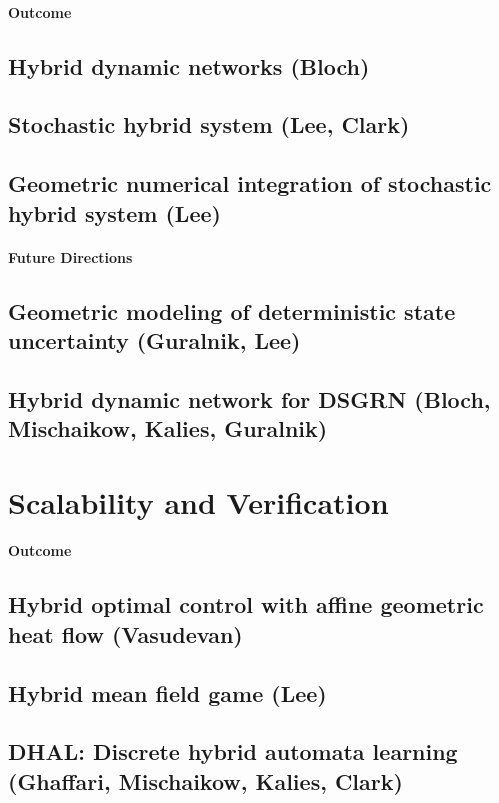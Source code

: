 \documentclass[letterpaper,11pt]{article}
\begin{document}
\paragraph*{Outcome}
\subsection{Hybrid dynamic networks (Bloch)}
\subsection{Stochastic hybrid system (Lee, Clark)}
\subsection{Geometric numerical integration of stochastic hybrid system (Lee)}
\paragraph*{Future Directions}
\subsection{Geometric modeling of deterministic state uncertainty (Guralnik, Lee)}
\subsection{Hybrid dynamic network for DSGRN (Bloch, Mischaikow, Kalies, Guralnik)}
\vspace*{0.3cm}


\section{Scalability and Verification}
\paragraph*{Outcome}
\subsection{Hybrid optimal control with affine geometric heat flow (Vasudevan)}
\subsection{Hybrid mean field game (Lee)}
\subsection{DHAL: Discrete hybrid automata learning (Ghaffari, Mischaikow, Kalies, Clark)}
\end{document}
